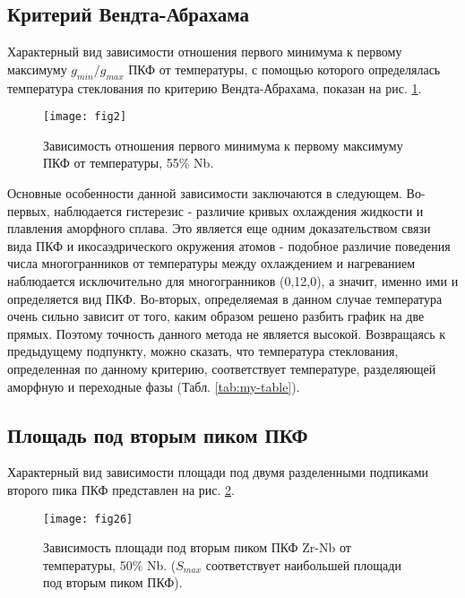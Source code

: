 \subsection{Критерий Вендта-Абрахама}
Характерный вид зависимости отношения первого минимума к первому максимуму $g_{min}/g_{max}$ ПКФ от температуры, с помощью которого определялась температура стеклования по критерию Вендта-Абрахама, показан на рис. \ref{VA_criterium}.  
\begin{figure}[h!]
	\begin{center}
		\texttt{[image: fig2]}{}{}{}
		\caption{Зависимость отношения первого минимума к первому максимуму ПКФ от температуры, 55\% Nb.}
		\label{VA_criterium}
	\end{center}
\end{figure}
Основные особенности данной зависимости заключаются в следующем. Во-первых, наблюдается гистерезис - различие кривых  охлаждения жидкости и плавления аморфного сплава. Это является еще одним доказательством связи вида ПКФ и икосаэдрического окружения атомов - подобное различие поведения числа многогранников от температуры между охлаждением и нагреванием наблюдается исключительно для многогранников (0,12,0), а значит, именно ими и определяется вид ПКФ. Во-вторых, определяемая в данном случае температура очень сильно зависит от того, каким образом решено разбить график на две прямых. Поэтому точность данного метода не является  высокой. Возвращаясь к предыдущему подпункту, можно сказать, что температура стеклования, определенная по данному критерию, соответствует  температуре, разделяющей аморфную и переходные фазы (Табл. \ref{tab:my-table}).

\subsection{Площадь под вторым пиком ПКФ}
Характерный вид зависимости площади под двумя разделенными подпиками второго пика ПКФ представлен на рис. \ref{Square_criterium}.
\begin{figure}[h!]
	\begin{center}
		\texttt{[image: fig26]}{}{}{}
		\caption{Зависимость площади под вторым пиком ПКФ Zr-Nb от температуры, 50\% Nb. ($S_{max}$  соответствует наибольшей площади под вторым пиком ПКФ).}
		\label{Square_criterium}
	\end{center}
\end{figure}

